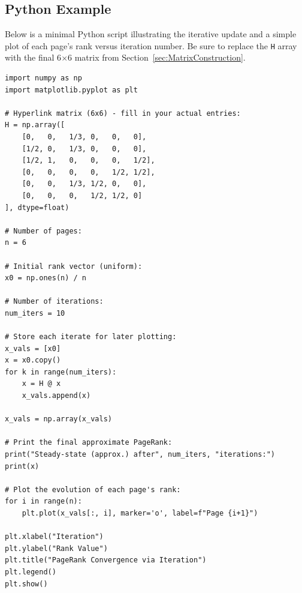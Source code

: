 \documentclass{article}
\begin{document}
\subsection{Python Example}
Below is a minimal Python script illustrating the iterative update and a simple 
plot of each page's rank versus iteration number. 
Be sure to replace the \verb|H| array with the final 6$\times$6 matrix 
from Section~\ref{sec:MatrixConstruction}.

\begin{verbatim}
import numpy as np
import matplotlib.pyplot as plt

# Hyperlink matrix (6x6) - fill in your actual entries:
H = np.array([
    [0,   0,   1/3, 0,   0,   0],
    [1/2, 0,   1/3, 0,   0,   0],
    [1/2, 1,   0,   0,   0,   1/2],
    [0,   0,   0,   0,   1/2, 1/2],
    [0,   0,   1/3, 1/2, 0,   0],
    [0,   0,   0,   1/2, 1/2, 0]
], dtype=float)

# Number of pages:
n = 6

# Initial rank vector (uniform):
x0 = np.ones(n) / n

# Number of iterations:
num_iters = 10

# Store each iterate for later plotting:
x_vals = [x0]
x = x0.copy()
for k in range(num_iters):
    x = H @ x
    x_vals.append(x)

x_vals = np.array(x_vals)

# Print the final approximate PageRank:
print("Steady-state (approx.) after", num_iters, "iterations:")
print(x)

# Plot the evolution of each page's rank:
for i in range(n):
    plt.plot(x_vals[:, i], marker='o', label=f"Page {i+1}")

plt.xlabel("Iteration")
plt.ylabel("Rank Value")
plt.title("PageRank Convergence via Iteration")
plt.legend()
plt.show()
\end{verbatim}
\end{document}
